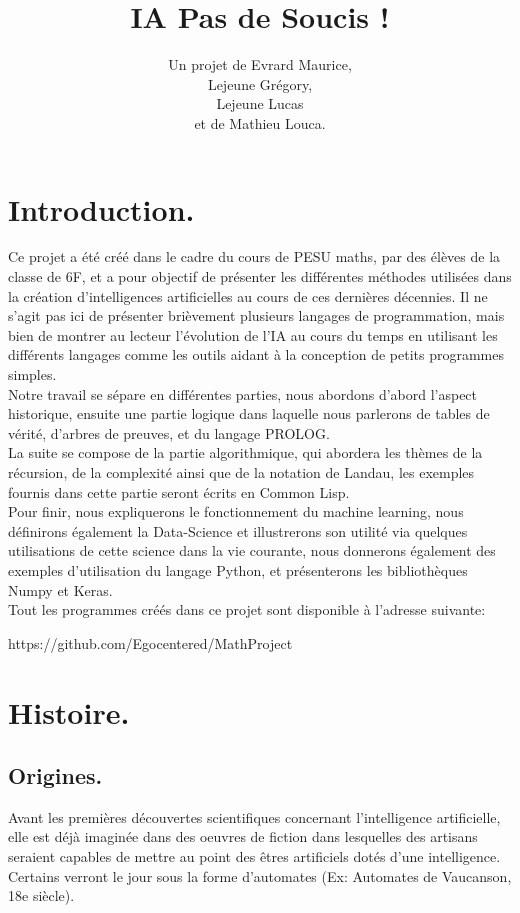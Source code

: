 \documentclass[a4paper, 12pt]{article}
\title{IA Pas de Soucis !}
\author{Un projet de Evrard Maurice,\\ Lejeune Grégory,\\ Lejeune Lucas \\ et de Mathieu Louca.}
\numberwithin{equation}{subsection}
\begin{document}
\onehalfspacing
\maketitle
\newpage
\tableofcontents
\newpage
\section{Introduction.}
Ce projet a été créé dans le cadre du cours de PESU maths, par des élèves de la classe de 6F, et a pour objectif de présenter les différentes méthodes utilisées dans la création d'intelligences artificielles au cours de ces dernières décennies. Il ne s'agit pas ici de présenter brièvement plusieurs langages de programmation, mais bien de montrer au lecteur l'évolution de l'IA au cours du temps en utilisant les différents langages comme les outils aidant à la conception de petits programmes simples.\\

Notre travail se sépare en différentes parties, nous abordons d'abord l'aspect historique, ensuite une partie logique dans laquelle nous parlerons de tables de vérité, d'arbres de preuves, et du langage PROLOG.\\

La suite se compose de la partie algorithmique, qui abordera les thèmes de la récursion, de la complexité ainsi que de la notation de Landau, les exemples fournis dans cette partie seront écrits en Common Lisp.\\

Pour finir, nous expliquerons le fonctionnement du machine learning, nous définirons également la Data-Science et illustrerons son utilité via quelques utilisations de cette science dans la vie courante,
nous donnerons également des exemples d'utilisation du langage Python, et présenterons les bibliothèques Numpy et Keras.\\

Tout les programmes créés dans ce projet sont disponible à l'adresse suivante: \begin{center}
  https://github.com/Egocentered/MathProject
\end{center}

\newpage
\section{Histoire.}
\subsection{Origines.}
Avant les premières découvertes scientifiques concernant l'intelligence artificielle, elle est déjà imaginée dans des oeuvres de fiction dans lesquelles des artisans seraient capables de mettre au point des êtres artificiels dotés d'une intelligence. Certains verront le jour sous la forme d'automates (Ex: Automates de Vaucanson, 18e siècle).\\
\end{document}
